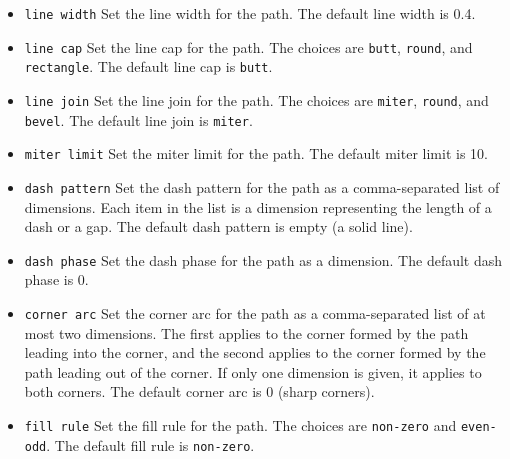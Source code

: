 \documentclass{article}
\begin{document}
\begin{itemize}
    \item \verb|line width| Set the line width for the path. The default line width is \qty{0.4}{\point}.
    \item \verb|line cap| Set the line cap for the path. The choices are \verb|butt|, \verb|round|, and \verb|rectangle|. The default line cap is \verb|butt|.
    \item \verb|line join| Set the line join for the path. The choices are \verb|miter|, \verb|round|, and \verb|bevel|. The default line join is \verb|miter|.
    \item \verb|miter limit| Set the miter limit for the path. The default miter limit is \num{10}.
    \item \verb|dash pattern| Set the dash pattern for the path as a comma-separated list of dimensions. Each item in the list is a dimension representing the length of a dash or a gap. The default dash pattern is empty (a solid line).
    \item \verb|dash phase| Set the dash phase for the path as a dimension. The default dash phase is \qty{0}{\point}.
\end{itemize}

\begin{itemize}
    \item \verb|corner arc| Set the corner arc for the path as a comma-separated list of at most two dimensions. The first applies to the corner formed by the path leading into the corner, and the second applies to the corner formed by the path leading out of the corner. If only one dimension is given, it applies to both corners. The default corner arc is \qty{0}{\point} (sharp corners).
    \item \verb|fill rule| Set the fill rule for the path. The choices are \verb|non-zero| and \verb|even-odd|. The default fill rule is \verb|non-zero|.
\end{itemize}
\end{document}
